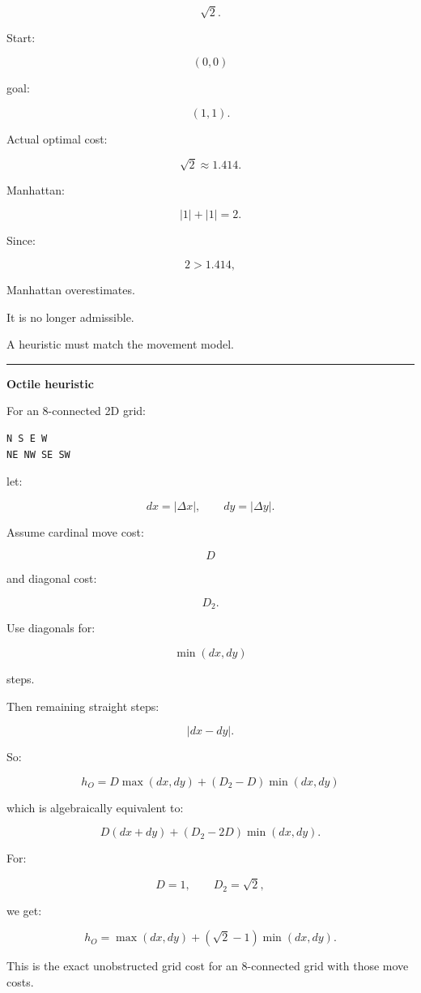 \[
\sqrt2.
\]

Start:

\[
(0,0)
\]

goal:

\[
(1,1).
\]

Actual optimal cost:

\[
\sqrt2\approx1.414.
\]

Manhattan:

\[
|1|+|1|=2.
\]

Since:

\[
2>1.414,
\]

Manhattan overestimates.

It is no longer admissible.

A heuristic must match the movement model.

\begin{center}\rule{0.5\linewidth}{0.5pt}\end{center}

\textbf{Octile heuristic}

For an 8-connected 2D grid:

\begin{verbatim}
N S E W
NE NW SE SW
\end{verbatim}

let:

\[
dx=|\Delta x|,
\qquad
dy=|\Delta y|.
\]

Assume cardinal move cost:

\[
D
\]

and diagonal cost:

\[
D_2.
\]

Use diagonals for:

\[
\min(dx,dy)
\]

steps.

Then remaining straight steps:

\[
|dx-dy|.
\]

So:

\[
\boxed{
h_O
=
D\max(dx,dy)
+
(D_2-D)\min(dx,dy)
}
\]

which is algebraically equivalent to:

\[
D(dx+dy)
+
(D_2-2D)\min(dx,dy).
\]

For:

\[
D=1,
\qquad
D_2=\sqrt2,
\]

we get:

\[
\boxed{
h_O
=
\max(dx,dy)
+
(\sqrt2-1)\min(dx,dy).
}
\]

This is the exact unobstructed grid cost for an 8-connected grid with those move costs.

